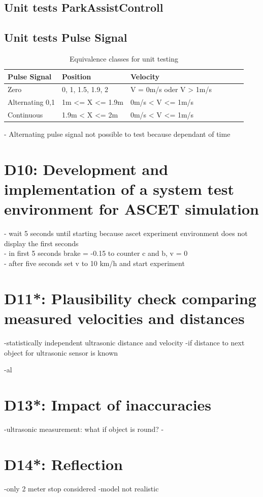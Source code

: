\section{Unit tests ParkAssistControll}
\section{Unit tests Pulse Signal}

\begin{table}[H]
\centering
\caption{Equivalence classes for unit testing}
\begin{adjustbox}{width=1\textwidth, center=\textwidth}
\renewcommand{\arraystretch}{1}
\begin{tabular}{lllllll}
\textbf{Pulse Signal} & \textbf{Position} & \textbf{Velocity}\\\hline
Zero & {0, 1, 1.5, 1.9, 2} & V = 0m/s oder V > 1m/s\\
Alternating 0,1 & 1m <= X <= 1.9m  & 0m/s < V <= 1m/s \\
Continuous & 1.9m < X <= 2m  & 0m/s < V <= 1m/s \\
\end{tabular}
\end{adjustbox}
\end{table}

- Alternating pulse signal not possible to test because dependant of time 

\chapter{D10: Development and implementation of a system test environment for ASCET simulation}\label{cha:D10}

- wait 5 seconds until starting because ascet experiment environment does not display the first seconds \\
- in first 5 seconds brake = -0.15 to counter c and b, v = 0 \\
- after five seconds set v to 10 km/h and start experiment

\chapter{D11*: Plausibility check comparing measured velocities and distances}\label{cha:D11}
-statistically independent ultrasonic distance and velocity
-if distance to next object for ultrasonic sensor is known

-al
\chapter{D13*: Impact of inaccuracies}\label{cha:D13}
-ultrasonic measurement: what if object is round?
-
\chapter{D14*: Reflection}\label{cha:D14}
-only 2 meter stop considered
-model not realistic